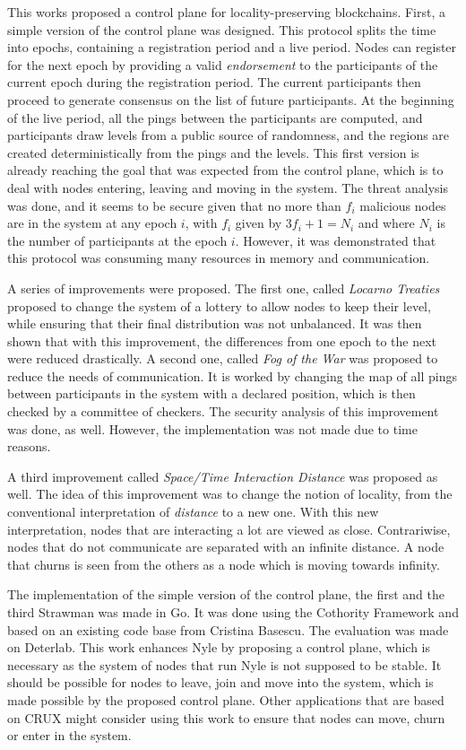 \documentclass[a4paper,11pt,twoside=semi,openright]{report}
\begin{document}
This works proposed a control plane for locality-preserving blockchains. First,
a simple version of the control plane was designed. This protocol splits the
time into epochs, containing a registration period and a live period. Nodes can
register for the next epoch by providing a valid \textit{endorsement} to the
participants of the current epoch during the registration period. The current
participants then proceed to generate consensus on the list of future
participants. At the beginning of the live period, all the pings between the
participants are computed, and participants draw levels from a public source of
randomness, and the regions are created deterministically from the pings and
the levels. This first version is already reaching the goal that was expected
from the control plane, which is to deal with nodes entering, leaving and
moving in the system. The threat analysis was done, and it seems to be secure
given that no more than $f_i$ malicious nodes are in the system at any epoch
$i$, with $f_i$ given by $3f_i+1=N_i$ and where $N_i$ is the number of
participants at the epoch $i$. However, it was demonstrated that this protocol
was consuming many resources in memory and communication. 

A series of improvements were proposed. The first one, called \textit{Locarno
Treaties} proposed to change the system of a lottery to allow nodes to keep
their level, while ensuring that their final distribution was not unbalanced.
It was then shown that with this improvement, the differences from one epoch to
the next were reduced drastically. A second one, called \textit{Fog of the War}
was proposed to reduce the needs of communication. It is worked by changing the
map of all pings between participants in the system with a declared position,
which is then checked by a committee of checkers. The security analysis of this
improvement was done, as well. However,  the implementation was not made due to time
reasons. 

A third improvement called \textit{Space/Time Interaction Distance} was
proposed as well. The idea of this improvement was to change the notion of
locality, from the conventional interpretation of \textit{distance} to a new one.
With this new interpretation, nodes that are interacting a lot are viewed as
close. Contrariwise, nodes that do not communicate are separated with an
infinite distance. A node that churns is seen from
the others as a node which is moving towards infinity.  

The implementation of the simple version of the control plane, the first and
the third Strawman was made in Go. It was done using the Cothority Framework
and based on an existing code base from Cristina Basescu. The evaluation was
made on Deterlab. This work enhances Nyle by proposing a control plane, which
is necessary as the system of nodes that run Nyle is not supposed to be
stable. It should be possible for nodes to leave, join and move into the
system, which is made possible by the proposed control plane. Other
applications that are based on CRUX \cite{Basescu2014} might consider using
this work to ensure that nodes can move, churn or enter in the system.
\end{document}
